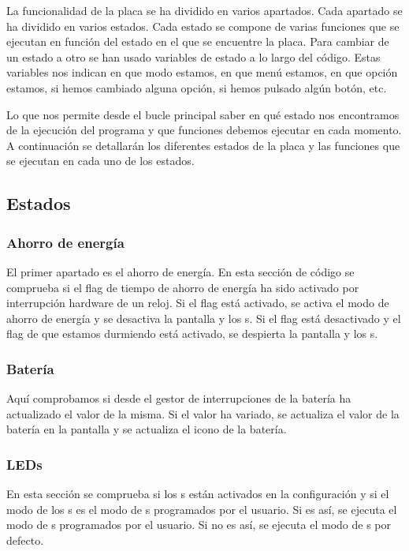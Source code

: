 La funcionalidad de la placa se ha dividido en varios apartados. Cada apartado se ha dividido en varios estados. Cada estado se compone de varias funciones que se ejecutan en función del estado en el que se encuentre la placa. Para cambiar de un estado a otro se han usado variables de estado a lo largo del código. Estas variables nos indican en que modo estamos, en que menú estamos, en que opción estamos, si hemos cambiado alguna opción, si hemos pulsado algún botón, etc.

Lo que nos permite desde el bucle principal saber en qué estado nos encontramos de la ejecución del programa y que funciones debemos ejecutar en cada momento. A continuación se detallarán los diferentes estados de la placa y las funciones que se ejecutan en cada uno de los estados.

\subsection{Estados}
\subsubsection{Ahorro de energía}
El primer apartado es el ahorro de energía. En esta sección de código se comprueba si el flag de tiempo de ahorro de energía ha sido activado por interrupción hardware de un reloj. Si el flag está activado, se activa el modo de ahorro de energía y se desactiva la pantalla y los s. Si el flag está desactivado y el flag de que estamos durmiendo está activado, se despierta la pantalla y los s.

\subsubsection{Batería}
Aquí comprobamos si desde el gestor de interrupciones de la batería ha actualizado el valor de la misma. Si el valor ha variado, se actualiza el valor de la batería en la pantalla y se actualiza el icono de la batería.

\subsubsection{\gls{LED}s}
En esta sección se comprueba si los s están activados en la configuración y si el modo de los s es el modo de s programados por el usuario. Si es así, se ejecuta el modo de s programados por el usuario. Si no es así, se ejecuta el modo de s por defecto.

